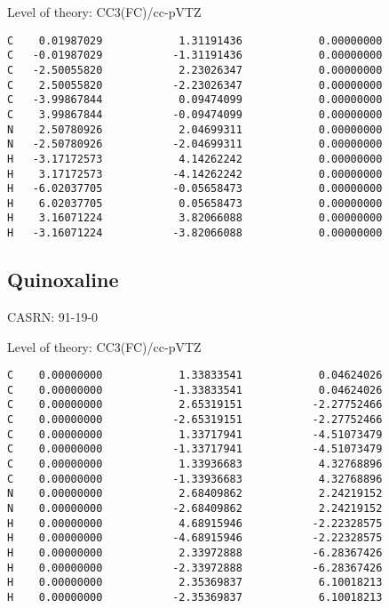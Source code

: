 \documentclass[journal=jctcce,manuscript=article,layout=traditional]{achemso}
\newcommand{\TZ}{cc-pVTZ}
\begin{document}
\begin{singlespace}
\noindent Level of theory: CC3(FC)/{\TZ}
\begin{verbatim}
C    0.01987029            1.31191436            0.00000000
C   -0.01987029           -1.31191436            0.00000000
C   -2.50055820            2.23026347            0.00000000
C    2.50055820           -2.23026347            0.00000000
C   -3.99867844            0.09474099            0.00000000
C    3.99867844           -0.09474099            0.00000000
N    2.50780926            2.04699311            0.00000000
N   -2.50780926           -2.04699311            0.00000000
H   -3.17172573            4.14262242            0.00000000
H    3.17172573           -4.14262242            0.00000000
H   -6.02037705           -0.05658473            0.00000000
H    6.02037705            0.05658473            0.00000000
H    3.16071224            3.82066088            0.00000000
H   -3.16071224           -3.82066088            0.00000000
\end{verbatim}
\end{singlespace}


\subsection{Quinoxaline}

CASRN: 91-19-0

\begin{singlespace}
\noindent Level of theory: CC3(FC)/{\TZ}
\begin{verbatim}
C    0.00000000            1.33833541            0.04624026
C    0.00000000           -1.33833541            0.04624026
C    0.00000000            2.65319151           -2.27752466
C    0.00000000           -2.65319151           -2.27752466
C    0.00000000            1.33717941           -4.51073479
C    0.00000000           -1.33717941           -4.51073479
C    0.00000000            1.33936683            4.32768896
C    0.00000000           -1.33936683            4.32768896
N    0.00000000            2.68409862            2.24219152
N    0.00000000           -2.68409862            2.24219152
H    0.00000000            4.68915946           -2.22328575
H    0.00000000           -4.68915946           -2.22328575
H    0.00000000            2.33972888           -6.28367426
H    0.00000000           -2.33972888           -6.28367426
H    0.00000000            2.35369837            6.10018213
H    0.00000000           -2.35369837            6.10018213
\end{verbatim}
\end{singlespace}
\end{document}
